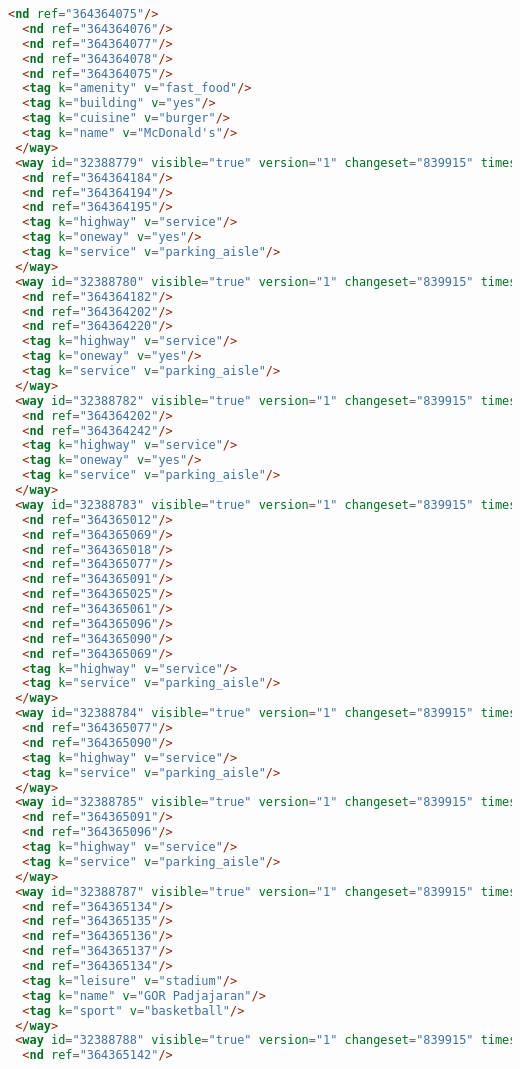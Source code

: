 \begin{lstlisting}[language=HTML,basicstyle=\tiny,caption=test.xml]
  <nd ref="364364075"/>
  <nd ref="364364076"/>
  <nd ref="364364077"/>
  <nd ref="364364078"/>
  <nd ref="364364075"/>
  <tag k="amenity" v="fast_food"/>
  <tag k="building" v="yes"/>
  <tag k="cuisine" v="burger"/>
  <tag k="name" v="McDonald's"/>
 </way>
 <way id="32388779" visible="true" version="1" changeset="839915" timestamp="2009-03-21T14:15:19Z" user="adhitya" uid="7748">
  <nd ref="364364184"/>
  <nd ref="364364194"/>
  <nd ref="364364195"/>
  <tag k="highway" v="service"/>
  <tag k="oneway" v="yes"/>
  <tag k="service" v="parking_aisle"/>
 </way>
 <way id="32388780" visible="true" version="1" changeset="839915" timestamp="2009-03-21T14:15:20Z" user="adhitya" uid="7748">
  <nd ref="364364182"/>
  <nd ref="364364202"/>
  <nd ref="364364220"/>
  <tag k="highway" v="service"/>
  <tag k="oneway" v="yes"/>
  <tag k="service" v="parking_aisle"/>
 </way>
 <way id="32388782" visible="true" version="1" changeset="839915" timestamp="2009-03-21T14:15:21Z" user="adhitya" uid="7748">
  <nd ref="364364202"/>
  <nd ref="364364242"/>
  <tag k="highway" v="service"/>
  <tag k="oneway" v="yes"/>
  <tag k="service" v="parking_aisle"/>
 </way>
 <way id="32388783" visible="true" version="1" changeset="839915" timestamp="2009-03-21T14:15:26Z" user="adhitya" uid="7748">
  <nd ref="364365012"/>
  <nd ref="364365069"/>
  <nd ref="364365018"/>
  <nd ref="364365077"/>
  <nd ref="364365091"/>
  <nd ref="364365025"/>
  <nd ref="364365061"/>
  <nd ref="364365096"/>
  <nd ref="364365090"/>
  <nd ref="364365069"/>
  <tag k="highway" v="service"/>
  <tag k="service" v="parking_aisle"/>
 </way>
 <way id="32388784" visible="true" version="1" changeset="839915" timestamp="2009-03-21T14:15:27Z" user="adhitya" uid="7748">
  <nd ref="364365077"/>
  <nd ref="364365090"/>
  <tag k="highway" v="service"/>
  <tag k="service" v="parking_aisle"/>
 </way>
 <way id="32388785" visible="true" version="1" changeset="839915" timestamp="2009-03-21T14:15:29Z" user="adhitya" uid="7748">
  <nd ref="364365091"/>
  <nd ref="364365096"/>
  <tag k="highway" v="service"/>
  <tag k="service" v="parking_aisle"/>
 </way>
 <way id="32388787" visible="true" version="1" changeset="839915" timestamp="2009-03-21T14:15:30Z" user="adhitya" uid="7748">
  <nd ref="364365134"/>
  <nd ref="364365135"/>
  <nd ref="364365136"/>
  <nd ref="364365137"/>
  <nd ref="364365134"/>
  <tag k="leisure" v="stadium"/>
  <tag k="name" v="GOR Padjajaran"/>
  <tag k="sport" v="basketball"/>
 </way>
 <way id="32388788" visible="true" version="1" changeset="839915" timestamp="2009-03-21T14:15:38Z" user="adhitya" uid="7748">
  <nd ref="364365142"/>

\end{lstlisting}

